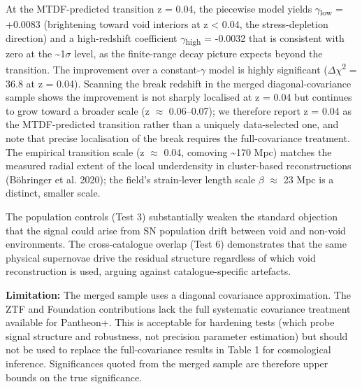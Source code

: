 \documentclass[11pt,a4paper]{article}
\begin{document}
At the MTDF-predicted transition z = 0.04, the piecewise model yields $\gamma$\textsubscript{low} = +0.0083 (brightening toward void interiors at z < 0.04, the stress-depletion direction) and a high-redshift coefficient $\gamma$\textsubscript{high} = -0.0032 that is consistent with zero at the \~{}1$\sigma$ level, as the finite-range decay picture expects beyond the transition. The improvement over a constant-$\gamma$ model is highly significant ($\Delta$$\chi$\textsuperscript{2} = 36.8 at z = 0.04). Scanning the break redshift in the merged diagonal-covariance sample shows the improvement is not sharply localised at z = 0.04 but continues to grow toward a broader scale (z $\approx$ 0.06--0.07); we therefore report z = 0.04 as the MTDF-predicted transition rather than a uniquely data-selected one, and note that precise localisation of the break requires the full-covariance treatment. The empirical transition scale (z $\approx$ 0.04, comoving \~{}170 Mpc) matches the measured radial extent of the local underdensity in cluster-based reconstructions (B\"ohringer et al. 2020); the field's strain-lever length scale $\beta$ $\approx$ 23 Mpc is a distinct, smaller scale.

The population controls (Test 3) substantially weaken the standard objection that the signal could arise from SN population drift between void and non-void environments. The cross-catalogue overlap (Test 6) demonstrates that the same physical supernovae drive the residual structure regardless of which void reconstruction is used, arguing against catalogue-specific artefacts.

\begin{mdframed}[linecolor=accent,linewidth=0.5pt,backgroundcolor=callout-bg,leftline=true,rightline=true,topline=true,bottomline=true,innerleftmargin=8pt,innerrightmargin=8pt,innertopmargin=6pt,innerbottommargin=6pt]
\textbf{Limitation:} The merged sample uses a diagonal covariance approximation. The ZTF and Foundation contributions lack the full systematic covariance treatment available for Pantheon+. This is acceptable for hardening tests (which probe signal structure and robustness, not precision parameter estimation) but should not be used to replace the full-covariance results in Table 1 for cosmological inference. Significances quoted from the merged sample are therefore upper bounds on the true significance.
\end{mdframed}
\end{document}
